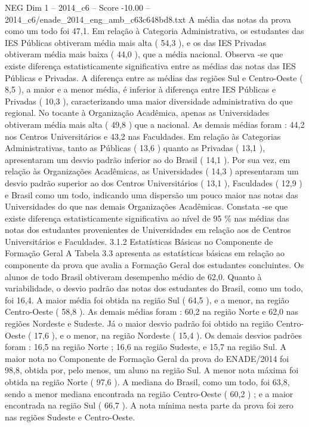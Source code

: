 \begin{textsample}{NEG Dim 1 – 2014\_c6 – Score -10.00 – 2014\_c6/enade\_2014\_eng\_amb\_c63c648bd8.txt}
A média das notas da prova como um todo foi 47,1.
Em relação à Categoria Administrativa, os estudantes das IES Públicas obtiveram média mais alta ( 54,3 ), e os das IES Privadas obtiveram média mais baixa ( 44,0 ), que a média nacional.
Observa -se que existe diferença estatisticamente significativa entre as médias das notas das IES Públicas e Privadas.
A diferença entre as médias das regiões Sul e Centro-Oeste ( 8,5 ), a maior e a menor média, é inferior à diferença entre IES Públicas e Privadas ( 10,3 ), caracterizando uma maior diversidade administrativa do que regional.
No tocante à Organização Acadêmica, apenas as Universidades obtiveram média mais alta ( 49,8 ) que a nacional.
As demais médias foram : 44,2 nos Centros Universitários e 43,2 nas Faculdades.
Em relação às Categorias Administrativas, tanto as Públicas ( 13,6 ) quanto as Privadas ( 13,1 ), apresentaram um desvio padrão inferior ao do Brasil ( 14,1 ).
Por sua vez, em relação às Organizações Acadêmicas, as Universidades ( 14,3 ) apresentaram um desvio padrão superior ao dos Centros Universitários ( 13,1 ), Faculdades ( 12,9 ) e Brasil como um todo, indicando uma dispersão um pouco maior nas notas das Universidades do que nas demais Organizações Acadêmicas.
Constata -se que existe diferença estatisticamente significativa ao nível de 95 \% nas médias das notas dos estudantes provenientes de Universidades em relação aos de Centros Universitários e Faculdades. 3.1.2 Estatísticas Básicas no Componente de Formação Geral A Tabela 3.3 apresenta as estatísticas básicas em relação ao componente da prova que avalia a Formação Geral dos estudantes concluintes.
Os alunos de todo Brasil obtiveram desempenho médio de 62,0.
Quanto à variabilidade, o desvio padrão das notas dos estudantes do Brasil, como um todo, foi 16,4.
A maior média foi obtida na região Sul ( 64,5 ), e a menor, na região Centro-Oeste ( 58,8 ).
As demais médias foram : 60,2 na região Norte e 62,0 nas regiões Nordeste e Sudeste.
Já o maior desvio padrão foi obtido na região Centro-Oeste ( 17,6 ), e o menor, na região Nordeste ( 15,4 ).
Os demais desvios padrões foram : 16,5 na região Norte ; 16,6 na região Sudeste, e 15,7 na região Sul.
A maior nota no Componente de Formação Geral da prova do ENADE/2014 foi 98,8, obtida por, pelo menos, um aluno na região Sul.
A menor nota máxima foi obtida na região Norte ( 97,6 ).
A mediana do Brasil, como um todo, foi 63,8, sendo a menor mediana encontrada na região Centro-Oeste ( 60,2 ) ; e a maior encontrada na região Sul ( 66,7 ).
A nota mínima nesta parte da prova foi zero nas regiões Sudeste e Centro-Oeste.

\end{textsample}

